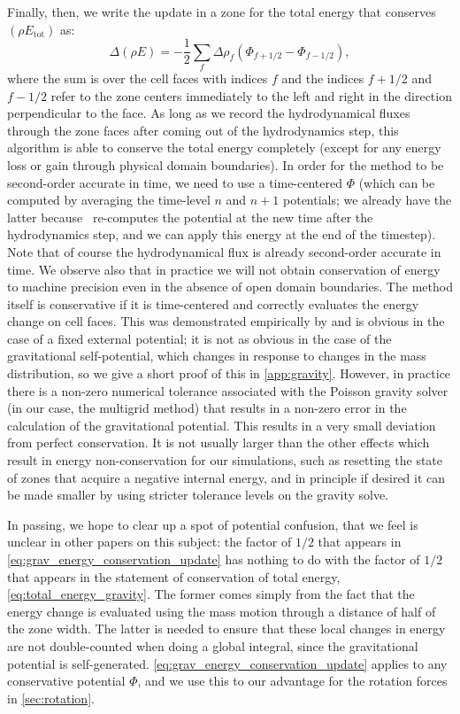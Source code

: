 \documentclass[12pt]{article}
\begin{document}
Finally, then, we write the update in a zone for the total energy that conserves $(\rho E_{\text{tot}})$ as:
\begin{equation}
  \Delta (\rho E) = -\frac{1}{2}\sum_{f} \Delta \rho_{f} (\Phi_{f+1/2} - \Phi_{f-1/2}),\label{eq:grav_energy_conservation_update}
\end{equation}
where the sum is over the cell faces with indices $f$ and the indices $f+1/2$ and $f-1/2$ refer to 
the zone centers immediately to the left and right in the direction perpendicular to the face.
As long as we record the hydrodynamical fluxes through the zone faces after coming out of the hydrodynamics step, 
this algorithm is able to conserve the total energy completely (except for any energy loss or gain through 
physical domain boundaries). In order for the method to be second-order accurate in time, 
we need to use a time-centered $\Phi$ (which can be computed by averaging the time-level $n$ and $n+1$ potentials;
we already have the latter because \castro\ re-computes the potential at the new time after the hydrodynamics step,
and we can apply this energy at the end of the timestep). Note that of course the hydrodynamical
flux is already second-order accurate in time. We observe also that in practice we will not obtain 
conservation of energy to machine precision even in the absence of open domain boundaries. The 
method itself is conservative if it is time-centered and correctly evaluates the energy change 
on cell faces. This was demonstrated empirically by \cite{jiang:2013} and is obvious in the case of a
fixed external potential; it is not as obvious in the case of the gravitational self-potential, which
changes in response to changes in the mass distribution, so we give a short proof of this in
\autoref{app:gravity}. However, in practice there is a non-zero numerical tolerance associated 
with the Poisson gravity solver (in our case, the multigrid method) that results in a non-zero error 
in the calculation of the gravitational potential. This results in a very small deviation from perfect 
conservation. It is not usually larger than the other effects which result in energy non-conservation 
for our simulations, such as resetting the state of zones that acquire a negative internal energy, and 
in principle if desired it can be made smaller by using stricter tolerance levels on the gravity solve.

In passing, we hope to clear up a spot of potential confusion, that we feel is unclear in other papers
on this subject: the factor of $1/2$ that appears in \autoref{eq:grav_energy_conservation_update} 
has nothing to do with the factor of $1/2$ that appears in the statement of conservation of total energy, 
\autoref{eq:total_energy_gravity}. The former comes simply from the fact that the energy change is 
evaluated using the mass motion through a distance of half of the zone width. The latter is needed 
to ensure that these local changes in energy are not double-counted when doing a global integral, 
since the gravitational potential is self-generated. \autoref{eq:grav_energy_conservation_update} 
applies to any conservative potential $\Phi$, and we use this to our advantage for the 
rotation forces in \autoref{sec:rotation}.
\end{document}
